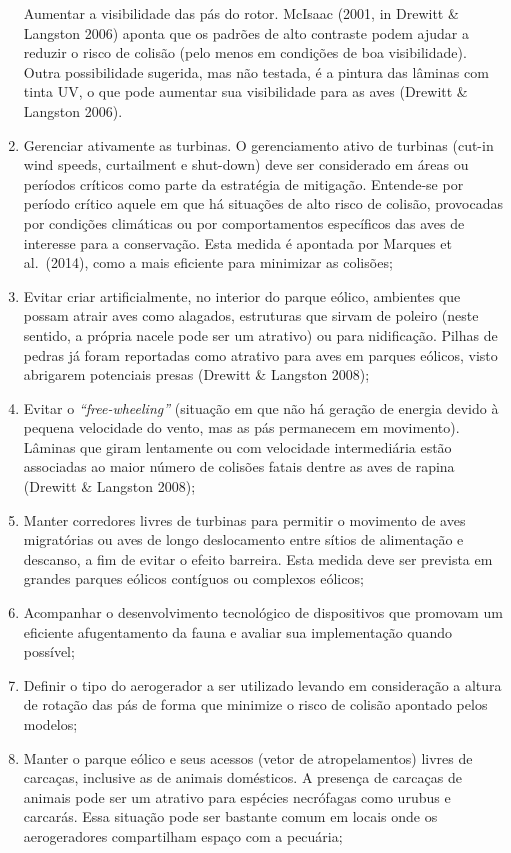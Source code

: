 \documentclass[
]{scrbook}
\begin{document}
\begin{enumerate}
  Aumentar a visibilidade das pás do rotor. McIsaac (2001, in Drewitt \& Langston 2006) aponta que os padrões de alto contraste podem ajudar a reduzir o risco de colisão (pelo menos em condições de boa visibilidade). Outra possibilidade sugerida, mas não testada, é a pintura das lâminas com tinta UV, o que pode aumentar sua visibilidade para as aves (Drewitt \& Langston 2006).
\item
  Gerenciar ativamente as turbinas. O gerenciamento ativo de turbinas (cut-in wind speeds, curtailment e shut-down) deve ser considerado em áreas ou períodos críticos como parte da estratégia de mitigação. Entende-se por período crítico aquele em que há situações de alto risco de colisão, provocadas por condições climáticas ou por comportamentos específicos das aves de interesse para a conservação. Esta medida é apontada por Marques et al.~(2014), como a mais eficiente para minimizar as colisões;
\item
  Evitar criar artificialmente, no interior do parque eólico, ambientes que possam atrair aves como alagados, estruturas que sirvam de poleiro (neste sentido, a própria nacele pode ser um atrativo) ou para nidificação. Pilhas de pedras já foram reportadas como atrativo para aves em parques eólicos, visto abrigarem potenciais presas (Drewitt \& Langston 2008);
\item
  Evitar o \emph{``free-wheeling''} (situação em que não há geração de energia devido à pequena velocidade do vento, mas as pás permanecem em movimento). Lâminas que giram lentamente ou com velocidade intermediária estão associadas ao maior número de colisões fatais dentre as aves de rapina (Drewitt \& Langston 2008);
\item
  Manter corredores livres de turbinas para permitir o movimento de aves migratórias ou aves de longo deslocamento entre sítios de alimentação e descanso, a fim de evitar o efeito barreira. Esta medida deve ser prevista em grandes parques eólicos contíguos ou complexos eólicos;
\item
  Acompanhar o desenvolvimento tecnológico de dispositivos que promovam um eficiente afugentamento da fauna e avaliar sua implementação quando possível;
\item
  Definir o tipo do aerogerador a ser utilizado levando em consideração a altura de rotação das pás de forma que minimize o risco de colisão apontado pelos modelos;
\item
  Manter o parque eólico e seus acessos (vetor de atropelamentos) livres de carcaças, inclusive as de animais domésticos. A presença de carcaças de animais pode ser um atrativo para espécies necrófagas como urubus e carcarás. Essa situação pode ser bastante comum em locais onde os aerogeradores compartilham espaço com a pecuária;

\end{enumerate}
\end{document}
